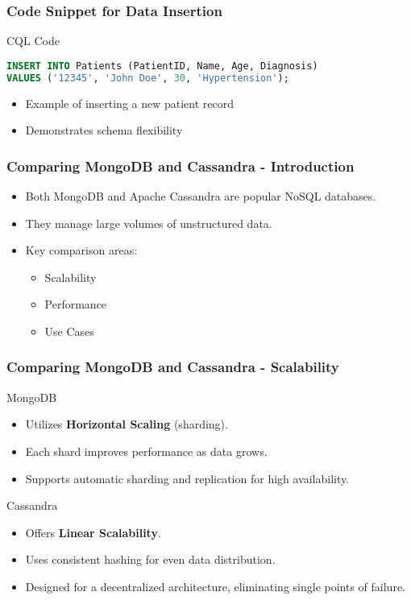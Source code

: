 \documentclass[aspectratio=169]{beamer}
\begin{document}
\begin{frame}[fragile]
    \frametitle{Code Snippet for Data Insertion}
    \begin{block}{CQL Code}
    \begin{lstlisting}[language=sql]
INSERT INTO Patients (PatientID, Name, Age, Diagnosis)
VALUES ('12345', 'John Doe', 30, 'Hypertension');
    \end{lstlisting}
    \end{block}
    \begin{itemize}
        \item Example of inserting a new patient record
        \item Demonstrates schema flexibility
    \end{itemize}
\end{frame}

\begin{frame}[fragile]
    \frametitle{Comparing MongoDB and Cassandra - Introduction}
    \begin{itemize}
        \item Both MongoDB and Apache Cassandra are popular NoSQL databases.
        \item They manage large volumes of unstructured data.
        \item Key comparison areas:
            \begin{itemize}
                \item Scalability
                \item Performance
                \item Use Cases
            \end{itemize}
    \end{itemize}
\end{frame}

\begin{frame}[fragile]
    \frametitle{Comparing MongoDB and Cassandra - Scalability}
    \begin{block}{MongoDB}
        \begin{itemize}
            \item Utilizes \textbf{Horizontal Scaling} (sharding).
            \item Each shard improves performance as data grows.
            \item Supports automatic sharding and replication for high availability.
        \end{itemize}
    \end{block}

    \begin{block}{Cassandra}
        \begin{itemize}
            \item Offers \textbf{Linear Scalability}.
            \item Uses consistent hashing for even data distribution.
            \item Designed for a decentralized architecture, eliminating single points of failure.
        \end{itemize}
    \end{block}
\end{frame}
\end{document}
